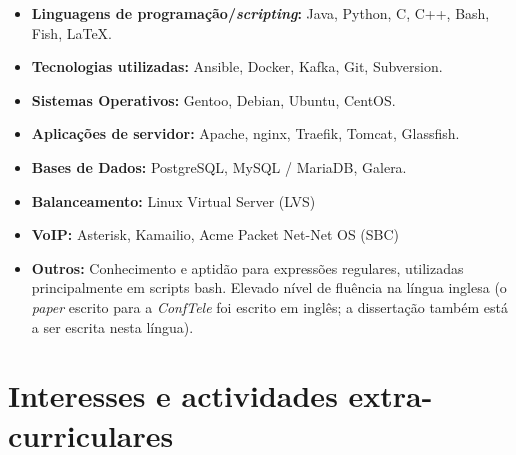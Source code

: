 \documentclass[11pt,a4paper,sans]{moderncv} %
\begin{document}
\begin{itemize}

\item \textbf{Linguagens de programação/\textit{scripting}:} Java, Python, C, C++, Bash, Fish, LaTeX. \\

\vspace{6pt}

\item \textbf{Tecnologias utilizadas:} Ansible, Docker, Kafka, Git, Subversion.
  
\vspace{6pt}

\item \textbf{Sistemas Operativos:} Gentoo, Debian, Ubuntu, CentOS.

\vspace{6pt}

\item \textbf{Aplicações de servidor:} Apache, nginx, Traefik, Tomcat,
  Glassfish.

\vspace{6pt}

\item \textbf{Bases de Dados:} PostgreSQL, MySQL / MariaDB, Galera.

\vspace{6pt}

\item \textbf{Balanceamento:} Linux Virtual Server (LVS)

\vspace{6pt}

\item \textbf{VoIP:} Asterisk, Kamailio, Acme Packet Net-Net OS (SBC)

\vspace{6pt}

\item \textbf{Outros: } Conhecimento e aptidão para expressões regulares,
  utilizadas principalmente em scripts bash. Elevado nível de fluência na língua
  inglesa (o \textit{paper} escrito para a \textit{ConfTele} foi escrito em
  inglês; a dissertação também está a ser escrita nesta língua).

\end{itemize}

\section{Interesses e actividades extra-curriculares}
\end{document}
